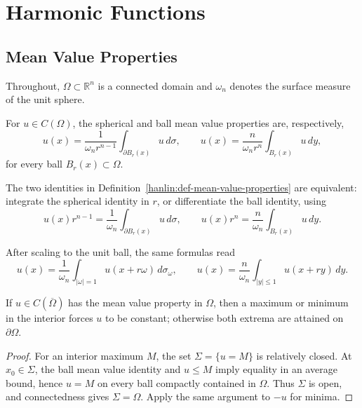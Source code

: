 \chapter{Harmonic Functions}

\section{Mean Value Properties}

Throughout, $\Omega\subset\mathbb R^n$ is a connected domain and $\omega_n$
denotes the surface measure of the unit sphere.

\begin{definition}\label{hanlin:def-mean-value-properties}
For $u\in C(\Omega)$, the spherical and ball mean value properties are,
respectively,
\[
 u(x)=\frac{1}{\omega_n r^{n-1}}\int_{\partial B_r(x)}u\,d\sigma,
 \qquad
 u(x)=\frac{n}{\omega_n r^n}\int_{B_r(x)}u\,dy,
\]
for every ball $B_r(x)\subset\Omega$.
\end{definition}

\begin{remark}\label{hanlin:remark-mean-value-equivalent}
The two identities in Definition~\ref{hanlin:def-mean-value-properties} are
equivalent: integrate the spherical identity in $r$, or differentiate the ball
identity, using
\[
u(x)r^{n-1}=\frac1{\omega_n}\int_{\partial B_r(x)}u\,d\sigma,
\qquad
u(x)r^n=\frac n{\omega_n}\int_{B_r(x)}u\,dy.
\]
\end{remark}

\begin{remark}\label{hanlin:remark-mean-value-equivalent-forms}
After scaling to the unit ball, the same formulas read
\[
u(x)=\frac1{\omega_n}\int_{|\omega|=1}u(x+r\omega)\,d\sigma_\omega,
\qquad
u(x)=\frac n{\omega_n}\int_{|y|\le1}u(x+ry)\,dy.
\]
\end{remark}

\begin{theorem}\label{hanlin:thm-mean-value-max}
If $u\in C(\overline\Omega)$ has the mean value property in $\Omega$, then a
maximum or minimum in the interior forces $u$ to be constant; otherwise both
extrema are attained on $\partial\Omega$.
\end{theorem}
\begin{proof}
\sketch For an interior maximum $M$, the set $\Sigma=\{u=M\}$ is relatively
closed. At $x_0\in\Sigma$, the ball mean value identity and $u\le M$ imply
equality in an average bound, hence $u=M$ on every ball compactly contained in
$\Omega$. Thus $\Sigma$ is open, and connectedness gives $\Sigma=\Omega$.
Apply the same argument to $-u$ for minima.
\end{proof}

